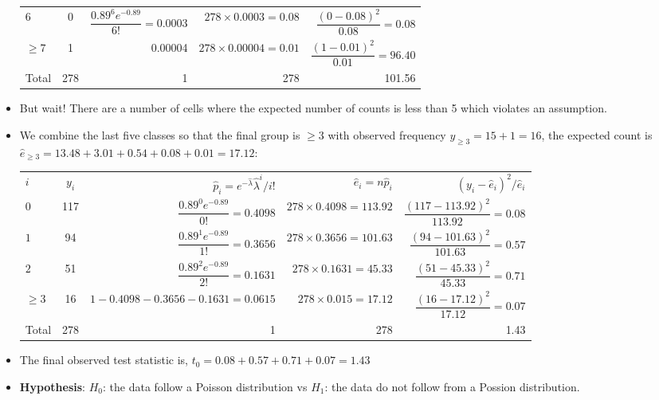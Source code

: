\documentclass[a4paper]{article}
\begin{document}
\begin{itemize}
\begin{table}[H]
\begin{tabular}{@{}l|crrr@{}}
		\( 6 \) &    0     &  \( \dfrac{0.89^6 e^{-0.89}}{6!} = 0.0003 \)& \( 278 \times 0.0003 = 0.08 \) & \( \dfrac{(0-0.08)^2}{0.08} = 0.08 \)  \\ \addlinespace[0.5em]  
		\( \geq 7 \) &  1 &  0.00004 & \( 278 \times 0.00004 = 0.01 \) & \( \dfrac{(1 - 0.01)^2}{0.01}=   96.40 \) \\
		\midrule  
		Total &  278  & 1 & 278 & 101.56 \\ \bottomrule
		\end{tabular}
	\end{table}
	\item But wait! There are a number of cells where the expected number of counts is less than 5 which violates an assumption.
	\item We combine the last five classes so that the final group is \( \geq 3 \) with observed frequency \( y_{\geq 3} = 15+1 = 16 \), the expected count is \( \hat{e}_{\ge3} = 13.48+3.01+0.54+0.08+0.01 = 17.12 \):
	\begin{table}[H]
		\centering
		\begin{tabular}{@{}l|crrr@{}}
		\toprule
		\( i \) & \( y_i \) &  \( \hat p_i=e^{- \hat{\lambda}}\hat{\lambda}^i /i! \) & \( \hat{e}_i = n\hat{p}_i \) & \( (y_i-\hat{e}_{i})^2/\hat{e}_{i} \) \\ \addlinespace[0.5em]\midrule  
		\( 0 \) &  117 &  \( \dfrac{0.89^0 e^{-0.89}}{0!} = 0.4098 \) & \( 278 \times 0.4098 = 113.92 \) & \( \dfrac{(117-113.92)^2}{113.92} = 0.08 \)  \\ \addlinespace[0.5em]  
		\( 1 \) &  94  &  \( \dfrac{0.89^1 e^{-0.89}}{1!} = 0.3656 \) & \( 278 \times 0.3656 = 101.63 \) & \( \dfrac{(94-101.63)^2}{101.63} = 0.57 \)    \\ \addlinespace[0.5em] 
		\( 2 \) &  51  &  \( \dfrac{0.89^2 e^{-0.89}}{2!} = 0.1631 \) & \( 278 \times 0.1631 = 45.33 \) & \( \dfrac{(51-45.33)^2}{45.33} = 0.71 \)  \\ \addlinespace[0.5em]
		\( \geq 3 \) & 16 & \( 1-0.4098-0.3656-0.1631 = 0.0615 \) & \( 278 \times 0.015 = 17.12 \) & \( \dfrac{(16 - 17.12)^2}{17.12} = 0.07 \) \\ \midrule
		Total &  278  & 1 & 278 & 1.43 \\ \bottomrule
		\end{tabular}
	\end{table}
	\item The final observed test statistic is, \( t_0 = 0.08 + 0.57 + 0.71 + 0.07 = 1.43 \) 
	\item \textbf{Hypothesis}: \( H_0 \): the data follow a Poisson distribution vs \( H_1 \): the data do not follow from a Possion distribution.

\end{itemize}
\end{document}
